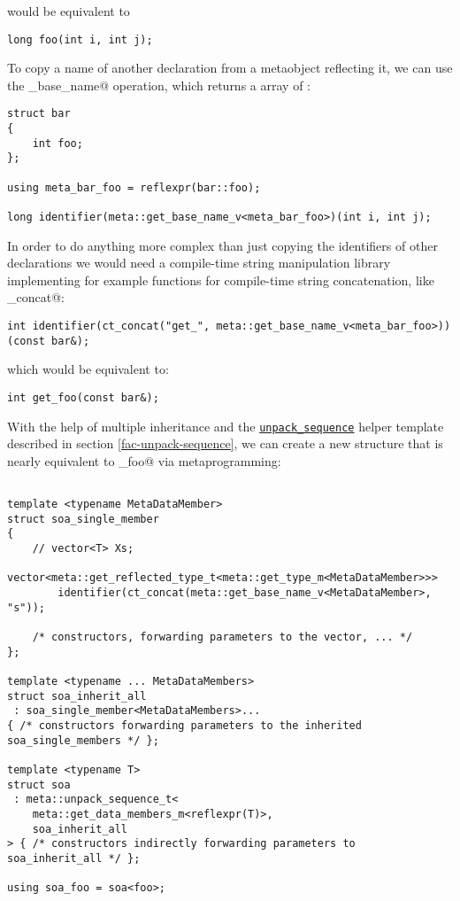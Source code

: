 would be equivalent to 

\begin{verbatim}
long foo(int i, int j);
\end{verbatim}

To copy a name of another declaration from a metaobject reflecting it,
we can use the \verb@get_base_name@ operation, which returns a \verb@constexpr@
array of \verb@char@s:

\begin{verbatim}
struct bar
{
	int foo;
};

using meta_bar_foo = reflexpr(bar::foo);

long identifier(meta::get_base_name_v<meta_bar_foo>)(int i, int j);
\end{verbatim}

In order to do anything more complex than just
copying the identifiers of other declarations we would need a compile-time
string manipulation library implementing for example functions for
compile-time string concatenation, like \verb@ct_concat@:

\begin{verbatim}
int identifier(ct_concat("get_", meta::get_base_name_v<meta_bar_foo>))(const bar&);
\end{verbatim}

which would be equivalent to:

\begin{verbatim}
int get_foo(const bar&);
\end{verbatim}

With the help of multiple inheritance and the
\hyperref[fac-unpack-sequence]{\texttt{unpack\_sequence}} helper template described
in section \ref{fac-unpack-sequence}, we can create a new structure that is
nearly equivalent to \verb@soa_foo@ via metaprogramming:

\begin{verbatim}

template <typename MetaDataMember>
struct soa_single_member
{
	// vector<T> Xs;
	vector<meta::get_reflected_type_t<meta::get_type_m<MetaDataMember>>>
		identifier(ct_concat(meta::get_base_name_v<MetaDataMember>, "s"));

	/* constructors, forwarding parameters to the vector, ... */
};

template <typename ... MetaDataMembers>
struct soa_inherit_all
 : soa_single_member<MetaDataMembers>...
{ /* constructors forwarding parameters to the inherited soa_single_members */ };

template <typename T>
struct soa
 : meta::unpack_sequence_t<
	meta::get_data_members_m<reflexpr(T)>,
	soa_inherit_all
> { /* constructors indirectly forwarding parameters to soa_inherit_all */ };

using soa_foo = soa<foo>;
\end{verbatim}

